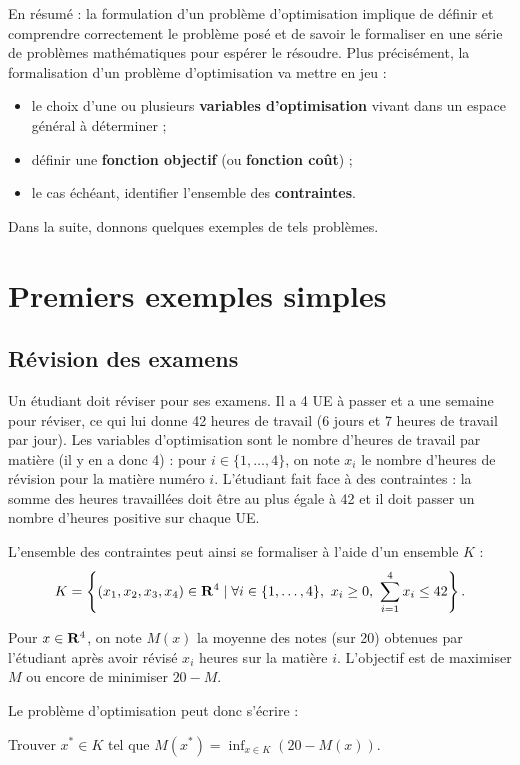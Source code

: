 \documentclass[grape]{../ceri/sty/MasterNotes}
\begin{document}
En résumé : la formulation d'un problème d'optimisation implique de définir et comprendre correctement le problème posé et de savoir le formaliser en une série de problèmes mathématiques pour espérer le résoudre. Plus précisément, la formalisation d'un problème d'optimisation va mettre en jeu :
\begin{itemize}[wide]
    \item le choix d'une ou plusieurs \textbf{variables d'optimisation} vivant dans un espace général à déterminer ;
    \item définir une \textbf{fonction objectif} (ou \textbf{fonction coût}) ;
    \item le cas échéant, identifier l'ensemble des \textbf{contraintes}.
\end{itemize}

Dans la suite, donnons quelques exemples de tels problèmes.

\section{Premiers exemples simples}

\subsection{Révision des examens}

Un étudiant doit réviser pour ses examens. Il a 4 UE à passer et a une semaine pour réviser, ce qui lui donne 42 heures de travail (6 jours et 7 heures de travail par jour). Les variables d'optimisation sont le nombre d'heures de travail par matière (il y en a donc 4) : pour $i\in\{1,\ldots,4\}$, on note $x_i$ le nombre d'heures de révision pour la matière numéro $i$. L'étudiant fait face à des contraintes : la somme des heures travaillées doit être au plus égale à 42 et il doit passer un nombre d'heures positive sur chaque UE.

L'ensemble des contraintes peut ainsi se formaliser à l'aide d'un ensemble $K$ :
\[ K = \left\{ (x_1,x_2,x_3,x_4)\in\mathbf{R}^4\mid \forall i\in\{1,\ldots,4\},\ x_i\ge 0,\ \sum_{i=1}^4x_i\le 42 \right\}. \]

Pour $x\in\mathbf{R}^4$, on note $M(x)$ la moyenne des notes (sur 20) obtenues par l'étudiant après avoir révisé $x_i$ heures sur la matière $i$. L'objectif est de maximiser $M$ ou encore de minimiser $20-M$.

Le problème d'optimisation peut donc s'écrire :
\begin{center}
    Trouver $x^*\in K$ tel que $M(x^*)=\displaystyle\inf_{x\in K}(20-M(x))$.
\end{center}
\end{document}
